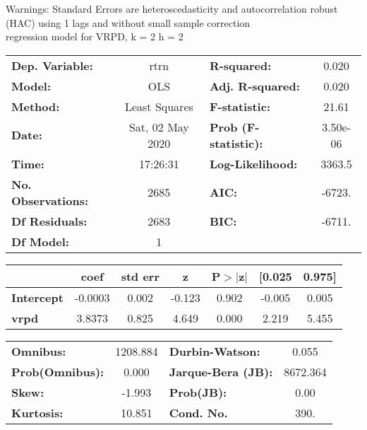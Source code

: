 Warnings: \newline
 [1] Standard Errors are heteroscedasticity and autocorrelation robust (HAC) using 1 lags and without small sample correction\\ 

regression model for VRPD, k = 2 h = 2\begin{center}
\begin{tabular}{lclc}
\toprule
\textbf{Dep. Variable:}    &       rtrn       & \textbf{  R-squared:         } &     0.020   \\
\textbf{Model:}            &       OLS        & \textbf{  Adj. R-squared:    } &     0.020   \\
\textbf{Method:}           &  Least Squares   & \textbf{  F-statistic:       } &     21.61   \\
\textbf{Date:}             & Sat, 02 May 2020 & \textbf{  Prob (F-statistic):} &  3.50e-06   \\
\textbf{Time:}             &     17:26:31     & \textbf{  Log-Likelihood:    } &    3363.5   \\
\textbf{No. Observations:} &        2685      & \textbf{  AIC:               } &    -6723.   \\
\textbf{Df Residuals:}     &        2683      & \textbf{  BIC:               } &    -6711.   \\
\textbf{Df Model:}         &           1      & \textbf{                     } &             \\
\bottomrule
\end{tabular}
\begin{tabular}{lcccccc}
                   & \textbf{coef} & \textbf{std err} & \textbf{z} & \textbf{P$> |$z$|$} & \textbf{[0.025} & \textbf{0.975]}  \\
\midrule
\textbf{Intercept} &      -0.0003  &        0.002     &    -0.123  &         0.902        &       -0.005    &        0.005     \\
\textbf{vrpd}      &       3.8373  &        0.825     &     4.649  &         0.000        &        2.219    &        5.455     \\
\bottomrule
\end{tabular}
\begin{tabular}{lclc}
\textbf{Omnibus:}       & 1208.884 & \textbf{  Durbin-Watson:     } &    0.055  \\
\textbf{Prob(Omnibus):} &   0.000  & \textbf{  Jarque-Bera (JB):  } & 8672.364  \\
\textbf{Skew:}          &  -1.993  & \textbf{  Prob(JB):          } &     0.00  \\
\textbf{Kurtosis:}      &  10.851  & \textbf{  Cond. No.          } &     390.  \\
\bottomrule
\end{tabular}
\end{center}

